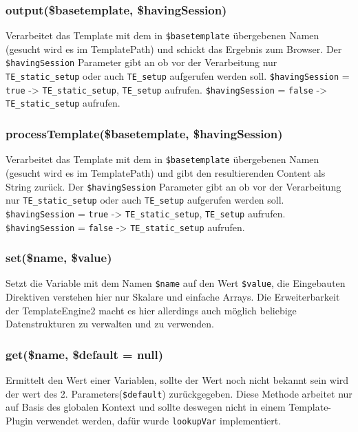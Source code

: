 \documentclass[a4paper,10pt]{article}
\begin{document}
\subsubsection{output(\$basetemplate, \$havingSession)}
Verarbeitet das Template mit dem in {\tt \$basetemplate} \"ubergebenen Namen (gesucht wird es im TemplatePath) und schickt das Ergebnis zum Browser.
Der {\tt \$havingSession} Parameter gibt an ob vor der Verarbeitung nur {\tt TE\_static\_setup} oder auch {\tt TE\_setup} aufgerufen werden soll.\newline
{\tt \$havingSession} = {\tt true} -{\textgreater} {\tt TE\_static\_setup}, {\tt TE\_setup} aufrufen.\newline
{\tt \$havingSession} = {\tt false} -{\textgreater} {\tt TE\_static\_setup} aufrufen.

\subsubsection{processTemplate(\$basetemplate, \$havingSession)}
Verarbeitet das Template mit dem in {\tt \$basetemplate} \"ubergebenen Namen (gesucht wird es im TemplatePath) und gibt den resultierenden Content
als String zur\"uck. Der {\tt \$havingSession} Parameter gibt an ob vor der Verarbeitung nur {\tt TE\_static\_setup} oder auch {\tt TE\_setup} aufgerufen werden soll.\newline
{\tt \$havingSession} = {\tt true} -{\textgreater} {\tt TE\_static\_setup}, {\tt TE\_setup} aufrufen.\newline
{\tt \$havingSession} = {\tt false} -{\textgreater} {\tt TE\_static\_setup} aufrufen.

\subsubsection{set(\$name, \$value)}
Setzt die Variable mit dem Namen {\tt \$name} auf den Wert {\tt \$value}, die Eingebauten Direktiven verstehen hier nur Skalare und einfache Arrays.
Die Erweiterbarkeit der TemplateEngine2 macht es hier allerdings auch m\"oglich beliebige Datenstrukturen zu verwalten und zu verwenden.

\subsubsection{get(\$name, \$default = null)}
Ermittelt den Wert einer Variablen, sollte der Wert noch nicht bekannt sein wird der wert des 2. Parameters({\tt \$default}) zur\"uckgegeben.
Diese Methode arbeitet nur auf Basis des globalen Kontext und sollte deswegen nicht in einem Template-Plugin verwendet werden, daf\"ur wurde {\tt lookupVar} implementiert.
\end{document}
